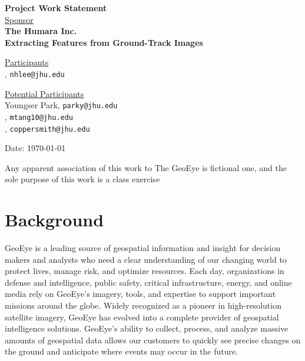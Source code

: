 \documentclass[12pt,letterpaper]{article}
\theoremstyle{definition}
\begin{document}
\def\shiftdowna{0.32in}  %
\def\shiftdownb{0.22in}  %


\begin{center}
\textbf{{\large Project Work Statement}}\\


\vspace \shiftdowna
\underline {Sponsor}\\ 
\vspace{5pt}
\textbf{{\large The Humara Inc.}}\\


\vspace \shiftdowna
\textbf{{\large Extracting Features from Ground-Track Images}}


\vspace{0.35in}
\vspace \shiftdownb
\underline {Participants} \\
\vspace{5pt}
, \texttt{nhlee@jhu.edu}

\vspace \shiftdownb
\underline {Potential Participants}\\
\vspace{5pt}
Youngser Park, \texttt{parky@jhu.edu} \\
\vspace{3pt}
, \texttt{mtang10@jhu.edu} \\
\vspace{3pt}
, \texttt{coppersmith@jhu.edu}

\vspace \shiftdowna
Date: \today

\end{center}

\vfill  
\footnoterule
\noindent \small{Any apparent association of this work to The GeoEye is
fictional one, and the sole purpose of this work is a class exercise}

\newpage

\section{Background} 
GeoEye is a leading source of geospatial information and insight for decision
makers and analysts who need a clear understanding of our changing world to
protect lives, manage risk, and optimize resources. Each day, organizations in
defense and intelligence, public safety, critical infrastructure, energy, and
online media rely on GeoEye's imagery, tools, and expertise to support
important missions around the globe. Widely recognized as a pioneer in
high-resolution satellite imagery, GeoEye has evolved into a complete provider
of geospatial intelligence solutions. GeoEye's ability to collect, process,
and analyze massive amounts of geospatial data allows our customers to quickly
see precise changes on the ground and anticipate where events may occur in the
future.
\end{document}
